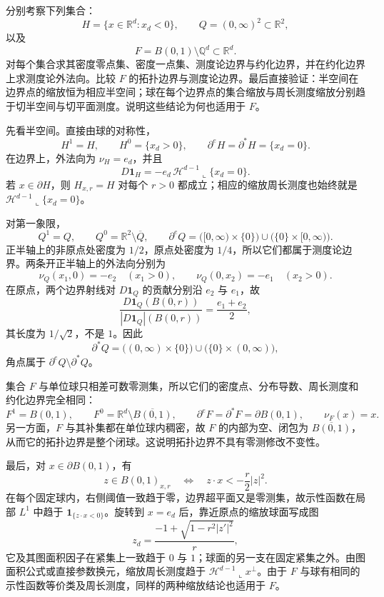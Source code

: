 \begin{exercise}\label{b1:ex:27-basic-boundaries-and-blowup}
分别考察下列集合：
\[
 H=\{x\in\mathbb R^d:x_d<0\},\qquad
 Q=(0,\infty)^2\subset\mathbb R^2,
\]
以及
\[
 F=B(0,1)\setminus\mathbb Q^d\subset\mathbb R^d.
\]
对每个集合求其密度零点集、密度一点集、测度论边界与约化边界，并在约化边界上求测度论外法向。比较 \(F\) 的拓扑边界与测度论边界。最后直接验证：半空间在边界点的缩放恒为相应半空间；球在每个边界点的集合缩放与周长测度缩放分别趋于切半空间与切平面测度。说明这些结论为何也适用于 \(F\)。
\end{exercise}
\begin{solution}
先看半空间。直接由球的对称性，
\[
 H^1=H,\qquad H^0=\{x_d>0\},\qquad
 \partial^eH=\partial^*H=\{x_d=0\}.
\]
在边界上，外法向为 \(\nu_H=e_d\)，并且
\[
 D\mathbf1_H=-e_d\,\mathcal H^{d-1}
                    \!\llcorner\{x_d=0\}.
\]
若 \(x\in\partial H\)，则 \(H_{x,r}=H\) 对每个 \(r>0\) 都成立；相应的缩放周长测度也始终就是 \(\mathcal H^{d-1}\llcorner\{x_d=0\}\)。

对第一象限，
\[
 Q^1=Q,\qquad Q^0=\mathbb R^2\setminus\overline Q,\qquad
 \partial^eQ=\bigl([0,\infty)\times\{0\}\bigr)
              \cup\bigl(\{0\}\times[0,\infty)\bigr).
\]
正半轴上的非原点处密度为 \(1/2\)，原点处密度为 \(1/4\)，所以它们都属于测度论边界。两条开正半轴上的外法向分别为
\[
 \nu_Q(x_1,0)=-e_2\quad(x_1>0),\qquad
 \nu_Q(0,x_2)=-e_1\quad(x_2>0).
\]
在原点，两个边界射线对 \(D\mathbf1_Q\) 的贡献分别沿 \(e_2\) 与 \(e_1\)，故
\[
 \frac{D\mathbf1_Q(B(0,r))}{|D\mathbf1_Q|(B(0,r))}
 =\frac{e_1+e_2}{2},
\]
其长度为 \(1/\sqrt2\)，不是 \(1\)。因此
\[
 \partial^*Q=\bigl((0,\infty)\times\{0\}\bigr)
              \cup\bigl(\{0\}\times(0,\infty)\bigr),
\]
角点属于 \(\partial^eQ\setminus\partial^*Q\)。

集合 \(F\) 与单位球只相差可数零测集，所以它们的密度点、分布导数、周长测度和约化边界完全相同：
\[
 F^1=B(0,1),\qquad F^0=\mathbb R^d\setminus\overline{B(0,1)},\qquad
 \partial^eF=\partial^*F=\partial B(0,1),\qquad
 \nu_F(x)=x.
\]
另一方面，\(F\) 与其补集都在单位球内稠密，故 \(F\) 的内部为空、闭包为 \(\overline{B(0,1)}\)，从而它的拓扑边界是整个闭球。这说明拓扑边界不具有零测修改不变性。

最后，对 \(x\in\partial B(0,1)\)，有
\[
 z\in B(0,1)_{x,r}
 \quad\Longleftrightarrow\quad
 z\cdot x<-\frac r2|z|^2.
\]
在每个固定球内，右侧阈值一致趋于零，边界超平面又是零测集，故示性函数在局部 \(L^1\) 中趋于 \(\mathbf1_{\{z\cdot x<0\}}\)。旋转到 \(x=e_d\) 后，靠近原点的缩放球面写成图
\[
 z_d=\frac{-1+\sqrt{1-r^2|z'|^2}}{r},
\]
它及其图面积因子在紧集上一致趋于 \(0\) 与 \(1\)；球面的另一支在固定紧集之外。由图面积公式或直接参数换元，缩放周长测度趋于
\(\mathcal H^{d-1}\llcorner x^\perp\)。由于 \(F\) 与球有相同的示性函数等价类及周长测度，同样的两种缩放结论也适用于 \(F\)。
\end{solution}

